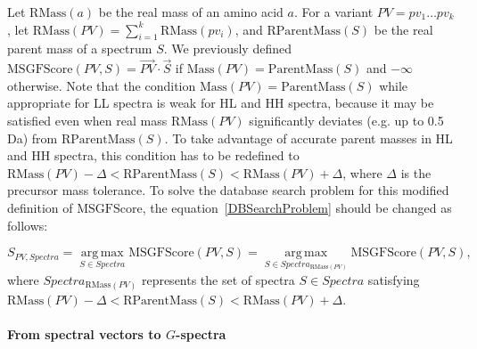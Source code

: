 Let $\textrm{RMass}(a)$ be the real mass of an amino acid $a$.
For a variant $PV=pv_1 \ldots pv_k$, let $\textrm{RMass}(PV) = \sum_{i=1}^{k}\textrm{RMass}(pv_i)$, and $\textrm{RParentMass}(S)$ be the real parent mass of a spectrum $S$.
We previously defined $\mathrm{MSGFScore}(PV,S)=\vec{PV} \cdot \vec{S}$ if $\textrm{Mass}(PV) = \textrm{ParentMass}(S)$
and $-\infty$ otherwise.
Note that the condition $\textrm{Mass}(PV) = \textrm{ParentMass}(S)$ while appropriate for LL spectra is weak for HL and HH spectra,
because it may be satisfied even when real mass $\textrm{RMass}(PV)$ significantly deviates (e.g. up to 0.5 Da) from $\textrm{RParentMass}(S)$. 
To take advantage of accurate parent masses in HL and HH spectra, this condition has to be redefined to 
$\textrm{RMass}(PV)-\Delta < \textrm{RParentMass}(S) < \textrm{RMass}(PV) + \Delta$, where $\Delta$ is the precursor mass tolerance.
To solve the database search problem for this modified definition of $\textrm{MSGFScore}$, 
the equation~\ref{DBSearchProblem} should be changed as follows:

\begin{equation}
\label{ModDBSearchProblem}
S_{PV,Spectra} = \operatorname*{arg\,max}_{S \in Spectra} \textrm{MSGFScore}(PV,S)
= \operatorname*{arg\,max}_{S \in Spectra_{\textrm{RMass}(PV)}} \textrm{MSGFScore}(PV,S),
\end{equation}
where $Spectra_{\textrm{RMass}(PV)}$ represents the set of spectra $S \in Spectra$ satisfying $\textrm{RMass}(PV)-\Delta < \textrm{RParentMass}(S) < \textrm{RMass}(PV) + \Delta$.

\paragraph{From spectral vectors to $G$-spectra}
\label{sec:ScoringHH}

%

